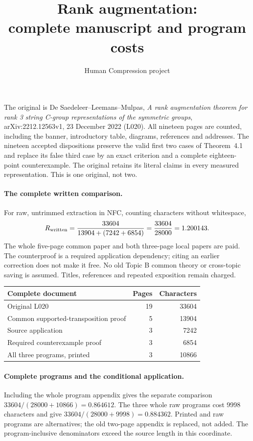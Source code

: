 \documentclass[11pt,a4paper]{article}
\title{Rank augmentation:\\complete manuscript and program costs}
\author{Human Compression project}\date{}
\begin{document}
\maketitle
The original is De Saedeleer--Leemans--Mulpas, \emph{A rank augmentation
theorem for rank 3 string C-group representations of the symmetric groups},
arXiv:2212.12563v1, 23 December 2022 (L020). All nineteen pages are counted,
including the banner, introductory table, diagrams, references and addresses.
The nineteen accepted dispositions preserve the valid first two cases of
Theorem~4.1 and replace its false third case by an exact criterion and a
complete eighteen-point counterexample. The original retains its literal
claims in every measured representation. This is one original, not two.

\paragraph{The complete written comparison.}
For raw, untrimmed extraction in NFC, counting characters without whitespace,
\[
R_{\rm written}=\frac{33604}{13904+(7242+6854)}
=\frac{33604}{28000}=1.200143.
\]
The whole five-page common paper and both three-page local papers are paid.
The counterproof is a required application dependency; citing an earlier
correction does not make it free. No old Topic B common theory or cross-topic
saving is assumed. Titles, references and repeated exposition remain charged.
\begin{center}\begin{tabular}{lrr}\toprule
Complete document&Pages&Characters\\\midrule
Original L020&19&33604\\
Common supported-transposition proof&5&13904\\
Source application&3&7242\\
Required counterexample proof&3&6854\\
All three programs, printed&3&10866\\\bottomrule
\end{tabular}\end{center}
\paragraph{Complete programs and the conditional application.}
Including the whole program appendix gives the separate comparison
$33604/(28000+10866)=0.864612$.
The three whole raw programs cost 9998 characters and give
$33604/(28000+9998)=0.884362$. Printed and raw programs are alternatives;
the old two-page appendix is replaced, not added.
The program-inclusive denominators exceed the source length in this coordinate.
\end{document}
